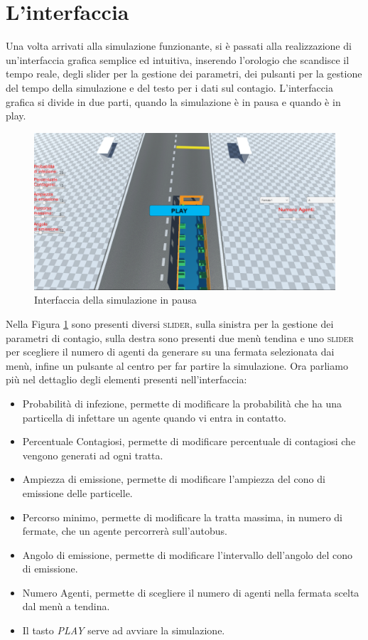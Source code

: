 \documentclass[12pt, openany]{book}
\begin{document}
 	\section{L'interfaccia}
 	Una volta arrivati alla simulazione funzionante, si è passati alla realizzazione di un'interfaccia grafica semplice ed intuitiva, inserendo l'orologio che scandisce il tempo reale, degli slider per la gestione dei parametri, dei pulsanti per la gestione del tempo della simulazione e del testo per i dati sul contagio. L'interfaccia grafica si divide in due parti, quando la simulazione è in pausa e quando è in play.
 	\begin{figure}[H]
 		\centering
 		\includegraphics[width=0.8\linewidth]{"Immagini/PausedGui.png"}
 		\caption{Interfaccia della simulazione in pausa}
 		\label{fig:InterfacciaPausa}
 	\end{figure}
 	Nella Figura \ref{fig:InterfacciaPausa} sono presenti diversi \textsc{slider}, sulla sinistra per la gestione dei parametri di contagio, sulla destra sono presenti due menù tendina e uno \textsc{slider} per scegliere il numero di agenti da generare su una fermata selezionata dai menù, infine un pulsante al centro per far partire la simulazione.
 	Ora parliamo più nel dettaglio degli elementi presenti nell'interfaccia:\\
 	\begin{itemize}
 		\item Probabilità di infezione, permette di modificare la probabilità che ha una particella di infettare un agente quando vi entra in contatto.
 		\item Percentuale Contagiosi, permette di modificare percentuale di contagiosi che vengono generati ad ogni tratta.
 		\item Ampiezza di emissione, permette di modificare l'ampiezza del cono di emissione delle particelle.
 		\item Percorso minimo, permette di modificare la tratta massima, in numero di fermate, che un agente percorrerà sull'autobus.
 		\item Angolo di emissione, permette di modificare l'intervallo dell'angolo del cono di emissione.
 		\item Numero Agenti, permette di scegliere il numero di agenti nella fermata scelta dal menù a tendina.
 		\item Il tasto \emph{PLAY} serve ad avviare la simulazione.
 	\end{itemize}
 
\end{document}
